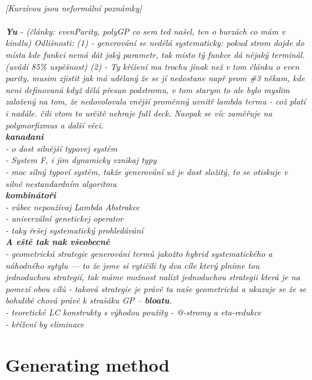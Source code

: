 \documentclass[conference]{IEEEtran}
\begin{document}
~\\
\textit{[Kurzívou jsou neformální poznámky]\\\\
\textbf{Yu} - (články: evenParity, polyGP co sem ted našel, ten o burzách co mám v kindlu)
Odlišnosti:
(1) - generování se nedělá systematicky: pokud strom dojde do místa
kde funkci nemá dát jaký parametr, tak místo tý funkce dá nějaký 
terminál.(uvádí 85\% uspěšnost)  
(2) - Ty křížení ma trochu jinak než v tom článku o even parity,
musim zjistit jak má udělaný že se jí nedostane např prom \#3 někam,
kde neni definovaná když dělá přesun podstromu, v tom starym to ale 
bylo myslim založený na tom, že nedovolovala vnější proměnný uvnitř
lambda termu - což platí i nadále. čili vtom to určitě nehraje full deck.
Naopak se víc zaměřuje na polymorfizmus a další věci.\\
\textbf{kanadani}\\ 
- o dost silnější typovej systém\\
- System F, i jim dynamicky vznikaj typy\\
- moc silný typoví systém, takže generování už je dost
  složitý, to se otiskuje v silně nestandardním algoritmu\\
\textbf{kombinátoři} \\
- vůbec nepoužívaj Lambda Abstrakce\\
- univerzální genetickej operator\\
- taky řešej systematický prohledávání\\
\textbf{A eště tak nak všeobecně}\\
- geometrická strategie generování termů jakožto hybrid systematického a náhodného sytylu --- to že jsme si vytičili ty dva cíle který plníme tou 
jednoduchou strategií, tak máme možnost nalízt jednoduchou strategii která 
je na pomezí obou cílů - taková strategie je právě ta naše geometrická 
a ukazuje se že se bohulibě chová právě k strašáku GP -- \textbf{bloatu}.\\
- teoretické LC konstrukty s výhodou použity - @-stromy a eta-redukce\\
- křížení by eliminace 
}


 

\section{Generating method}
\end{document}

